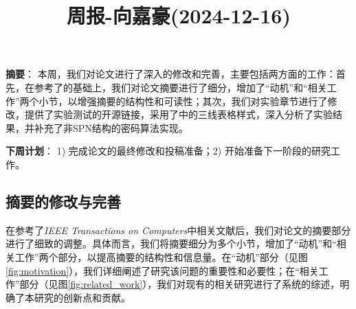 \documentclass[11pt,a4paper]{article}
\title{周报-向嘉豪(2024-12-16)}
\renewcommand{\maketitle}{
  \begin{center}
    \LARGE\bfseries\thetitle
  \end{center}
}
\begin{document}
\maketitle

\noindent \textbf{摘要}：
本周，我们对论文进行了深入的修改和完善，主要包括两方面的工作：首先，在参考了\cite{Liu2020}的基础上，我们对论文摘要进行了细分，增加了“动机”和“相关工作”两个小节，以增强摘要的结构性和可读性；其次，我们对实验章节进行了修改，提供了实验测试的开源链接，采用了\cite{Liu2020}中的三线表格样式，深入分析了实验结果，并补充了非SPN结构的密码算法实现。

\noindent \textbf{下周计划}： 1) 完成论文的最终修改和投稿准备；2) 开始准备下一阶段的研究工作。



\subsection{摘要的修改与完善}

在参考了\textit{IEEE Transactions on Computers}中相关文献\cite{Liu2020}后，我们对论文的摘要部分进行了细致的调整。具体而言，我们将摘要细分为多个小节，增加了“动机”和“相关工作”两个部分，以提高摘要的结构性和信息量。在“动机”部分（见图\ref{fig:motivation}），我们详细阐述了研究该问题的重要性和必要性；在“相关工作”部分（见图\ref{fig:related_work}），我们对现有的相关研究进行了系统的综述，明确了本研究的创新点和贡献。
\end{document}
